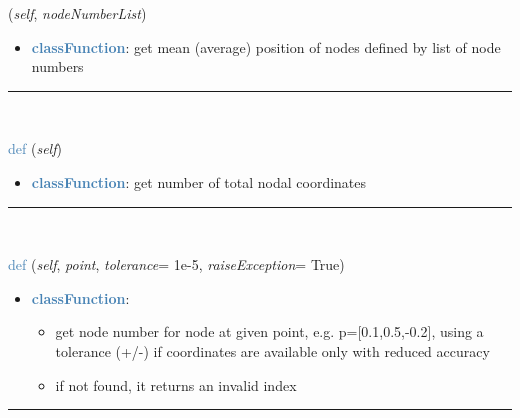 \begin{itemize}[leftmargin=1.4cm]
\begin{itemize}[leftmargin=1.4cm]
\begin{itemize}[leftmargin=1.4cm]
\begin{itemize}[leftmargin=0.5cm]
\begin{itemize}[leftmargin=1.4cm]
\begin{itemize}[leftmargin=1.4cm]
\begin{itemize}[leftmargin=1.4cm]
\begin{itemize}[leftmargin=0.5cm]
\begin{flushleft}
({\it self}, {\it nodeNumberList})
\end{flushleft}
\setlength{\itemindent}{0.7cm}
\begin{itemize}[leftmargin=0.7cm]
\item[--]\textcolor{steelblue}{\bf classFunction}: get mean (average) position of nodes defined by list of node numbers
\vspace{12pt}\end{itemize}
%
\noindent\rule{8cm}{0.75pt}\vspace{1pt} \\ 
\begin{flushleft}
\noindent \textcolor{steelblue}{def {\bf {}}}\label{sec:FEM:FEMinterface:NumberOfCoordinates}
({\it self})
\end{flushleft}
\setlength{\itemindent}{0.7cm}
\begin{itemize}[leftmargin=0.7cm]
\item[--]\textcolor{steelblue}{\bf classFunction}: get number of total nodal coordinates
\vspace{12pt}\end{itemize}
%
\noindent\rule{8cm}{0.75pt}\vspace{1pt} \\ 
\begin{flushleft}
\noindent \textcolor{steelblue}{def {\bf {}}}\label{sec:FEM:FEMinterface:GetNodeAtPoint}
({\it self}, {\it point}, {\it tolerance}= 1e-5, {\it raiseException}= True)
\end{flushleft}
\setlength{\itemindent}{0.7cm}
\begin{itemize}[leftmargin=0.7cm]
\item[--]\textcolor{steelblue}{\bf classFunction}: \vspace{-6pt}
\begin{itemize}[leftmargin=1.2cm]
\setlength{\itemindent}{-0.7cm}
\item[]get node number for node at given point, e.g. p=[0.1,0.5,-0.2], using a tolerance (+/-) if coordinates are available only with reduced accuracy
\item[]if not found, it returns an invalid index
\end{itemize}
\vspace{12pt}\end{itemize}
%
\noindent\rule{8cm}{0.75pt}\vspace{1pt} \\ 

\end{itemize}
\end{itemize}
\end{itemize}
\end{itemize}
\end{itemize}
\end{itemize}
\end{itemize}
\end{itemize}
